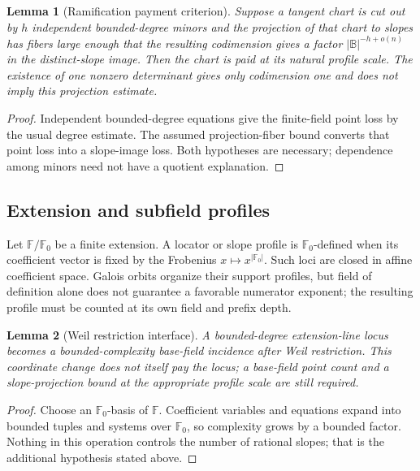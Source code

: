 \documentclass[12pt,a4paper]{amsart}
\numberwithin{equation}{section}
\newtheorem{lemma}[lemma]{Lemma}
\theoremstyle{remark}
\newcommand{\F}{\mathbb F}
\newcommand{\B}{\mathbb B}
\newcommand{\abs}[1]{\lvert #1\rvert}
\begin{document}
\begin{lemma}[Ramification payment criterion]\label{lem:ramification-payment-expanded}
Suppose a tangent chart is cut out by \(h\) independent bounded-degree
minors and the projection of that chart to slopes has fibers large enough
that the resulting codimension gives a factor \(\abs\B^{-h+o(n)}\) in the
distinct-slope image.  Then the chart is paid at its natural profile scale.
The existence of one nonzero determinant gives only codimension one and
does not imply this projection estimate.
\end{lemma}

\begin{proof}
Independent bounded-degree equations give the finite-field point loss by
the usual degree estimate.  The assumed projection-fiber bound converts
that point loss into a slope-image loss.  Both hypotheses are necessary;
dependence among minors need not have a quotient explanation.
\end{proof}

\subsection*{Extension and subfield profiles}
Let \(\F/\F_0\) be a finite extension.  A locator or slope profile is \(\F_0\)-defined when its coefficient vector is fixed by the Frobenius \(x\mapsto x^{\abs{
\F_0}}\).  Such loci are closed in affine coefficient space.  Galois
orbits organize their support profiles, but field of definition alone does
not guarantee a favorable numerator exponent; the resulting profile must
be counted at its own field and prefix depth.

\begin{lemma}[Weil restriction interface]\label{lem:weil-restriction-expanded}
A bounded-degree extension-line locus becomes a bounded-complexity
base-field incidence after Weil restriction.  This coordinate change does
not itself pay the locus; a base-field point count and a slope-projection
bound at the appropriate profile scale are still required.
\end{lemma}

\begin{proof}
Choose an \(\F_0\)-basis of \(\F\).  Coefficient variables and equations
expand into bounded tuples and systems over \(\F_0\), so complexity grows
by a bounded factor.  Nothing in this operation controls the number of
rational slopes; that is the additional hypothesis stated above.
\end{proof}
\end{document}
